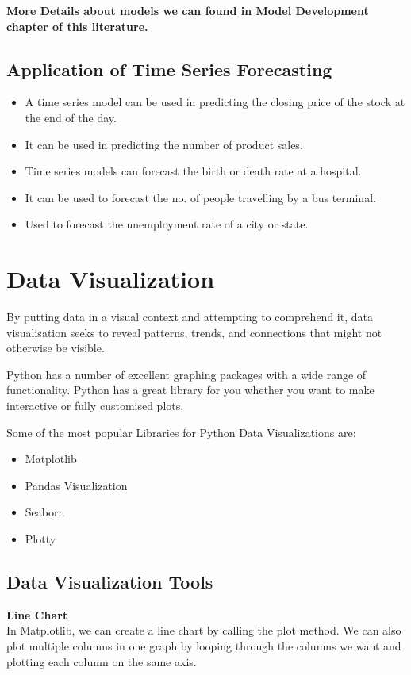 \textbf{More Details about models we can found in Model Development chapter of this literature.}

\vspace{30}

\subsection{Application of Time Series Forecasting }
\begin{itemize}
    \item A time series model can be used in predicting the closing price of the stock at the end of the day.
\item It can be used in predicting the number of product sales.
\item Time series models can forecast the birth or death rate at a hospital.
\item It can be used to forecast the no. of people travelling by a bus terminal.
\item Used to forecast the unemployment rate of a city or state.
\end{itemize}

\vspace{50mm}

\section{Data Visualization}
\hspace{10mm}By putting data in a visual context and attempting to comprehend it, data visualisation seeks to reveal patterns, trends, and connections that might not otherwise be visible.

Python has a number of excellent graphing packages with a wide range of functionality. Python has a great library for you whether you want to make interactive or fully customised plots.

Some of the most popular Libraries for Python Data Visualizations are:
\begin{itemize}
    \item Matplotlib
    \item Pandas Visualization
    \item Seaborn
    \item Plotty
\end{itemize}

\subsection{Data Visualization Tools}
\textbf{Line Chart} \\
In Matplotlib, we can create a line chart by calling the plot method. We can also plot multiple columns in one graph by looping through the columns we want and plotting each column on the same axis.

